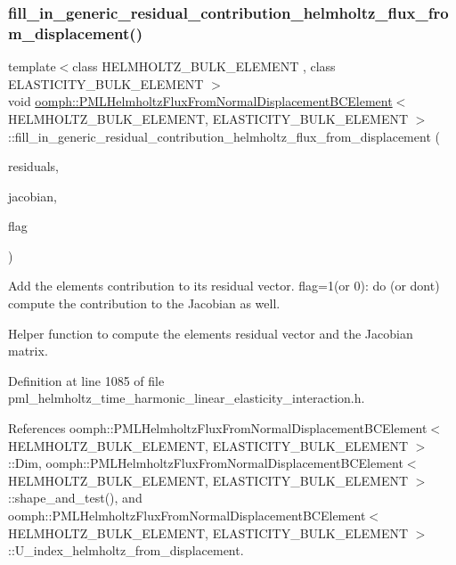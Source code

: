 \subsubsection{\texorpdfstring{fill\+\_\+in\+\_\+generic\+\_\+residual\+\_\+contribution\+\_\+helmholtz\+\_\+flux\+\_\+from\+\_\+displacement()}{fill\_in\_generic\_residual\_contribution\_helmholtz\_flux\_from\_displacement()}}
{\footnotesize\ttfamily template$<$class H\+E\+L\+M\+H\+O\+L\+T\+Z\+\_\+\+B\+U\+L\+K\+\_\+\+E\+L\+E\+M\+E\+NT , class E\+L\+A\+S\+T\+I\+C\+I\+T\+Y\+\_\+\+B\+U\+L\+K\+\_\+\+E\+L\+E\+M\+E\+NT $>$ \\
void \hyperlink{classoomph_1_1PMLHelmholtzFluxFromNormalDisplacementBCElement}{oomph\+::\+P\+M\+L\+Helmholtz\+Flux\+From\+Normal\+Displacement\+B\+C\+Element}$<$ H\+E\+L\+M\+H\+O\+L\+T\+Z\+\_\+\+B\+U\+L\+K\+\_\+\+E\+L\+E\+M\+E\+NT, E\+L\+A\+S\+T\+I\+C\+I\+T\+Y\+\_\+\+B\+U\+L\+K\+\_\+\+E\+L\+E\+M\+E\+NT $>$\+::fill\+\_\+in\+\_\+generic\+\_\+residual\+\_\+contribution\+\_\+helmholtz\+\_\+flux\+\_\+from\+\_\+displacement (\begin{DoxyParamCaption}\item[{Vector$<$ double $>$ \&}]{residuals,  }\item[{Dense\+Matrix$<$ double $>$ \&}]{jacobian,  }\item[{const unsigned \&}]{flag }\end{DoxyParamCaption})\hspace{0.3cm}{\ttfamily [private]}}



Add the element\textquotesingle{}s contribution to its residual vector. flag=1(or 0)\+: do (or don\textquotesingle{}t) compute the contribution to the Jacobian as well. 

Helper function to compute the element\textquotesingle{}s residual vector and the Jacobian matrix. 

Definition at line 1085 of file pml\+\_\+helmholtz\+\_\+time\+\_\+harmonic\+\_\+linear\+\_\+elasticity\+\_\+interaction.\+h.



References oomph\+::\+P\+M\+L\+Helmholtz\+Flux\+From\+Normal\+Displacement\+B\+C\+Element$<$ H\+E\+L\+M\+H\+O\+L\+T\+Z\+\_\+\+B\+U\+L\+K\+\_\+\+E\+L\+E\+M\+E\+N\+T, E\+L\+A\+S\+T\+I\+C\+I\+T\+Y\+\_\+\+B\+U\+L\+K\+\_\+\+E\+L\+E\+M\+E\+N\+T $>$\+::\+Dim, oomph\+::\+P\+M\+L\+Helmholtz\+Flux\+From\+Normal\+Displacement\+B\+C\+Element$<$ H\+E\+L\+M\+H\+O\+L\+T\+Z\+\_\+\+B\+U\+L\+K\+\_\+\+E\+L\+E\+M\+E\+N\+T, E\+L\+A\+S\+T\+I\+C\+I\+T\+Y\+\_\+\+B\+U\+L\+K\+\_\+\+E\+L\+E\+M\+E\+N\+T $>$\+::shape\+\_\+and\+\_\+test(), and oomph\+::\+P\+M\+L\+Helmholtz\+Flux\+From\+Normal\+Displacement\+B\+C\+Element$<$ H\+E\+L\+M\+H\+O\+L\+T\+Z\+\_\+\+B\+U\+L\+K\+\_\+\+E\+L\+E\+M\+E\+N\+T, E\+L\+A\+S\+T\+I\+C\+I\+T\+Y\+\_\+\+B\+U\+L\+K\+\_\+\+E\+L\+E\+M\+E\+N\+T $>$\+::\+U\+\_\+index\+\_\+helmholtz\+\_\+from\+\_\+displacement.



